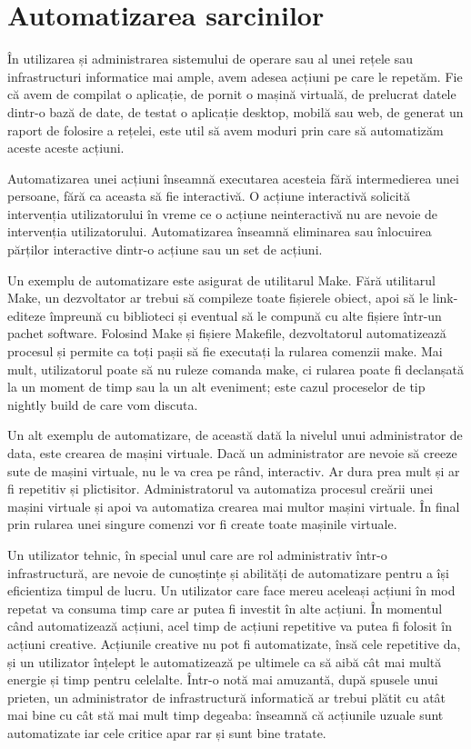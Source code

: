 \chapter{Automatizarea sarcinilor}
\label{chapter:script}

În utilizarea și administrarea sistemului de operare sau al unei rețele sau
infrastructuri informatice mai ample, avem adesea acțiuni pe care le repetăm.
Fie că avem de compilat o aplicație, de pornit o mașină virtuală, de prelucrat
datele dintr-o bază de date, de testat o aplicație desktop, mobilă sau web, de
generat un raport de folosire a rețelei, este util să avem moduri prin care să
automatizăm aceste aceste acțiuni.

Automatizarea unei acțiuni înseamnă executarea acesteia fără intermedierea unei
persoane, fără ca aceasta să fie interactivă. O acțiune interactivă solicită
intervenția utilizatorului în vreme ce o acțiune neinteractivă nu are nevoie de
intervenția utilizatorului. Automatizarea înseamnă eliminarea sau înlocuirea
părților interactive dintr-o acțiune sau un set de acțiuni.

Un exemplu de automatizare este asigurat de utilitarul Make. Fără utilitarul
Make, un dezvoltator ar trebui să compileze toate fișierele obiect, apoi să le
link-editeze împreună cu biblioteci și eventual să le compună cu alte fișiere
într-un pachet software. Folosind Make și fișiere Makefile, dezvoltatorul
automatizează procesul și permite ca toți pașii să fie executați la rularea
comenzii make. Mai mult, utilizatorul poate să nu ruleze comanda make, ci
rularea poate fi declanșată la un moment de timp sau la un alt eveniment; este
cazul proceselor de tip nightly build de care vom discuta.

Un alt exemplu de automatizare, de această dată la nivelul unui administrator de
data, este crearea de mașini virtuale. Dacă un administrator are nevoie să
creeze sute de mașini virtuale, nu le va crea pe rând, interactiv. Ar dura prea
mult și ar fi repetitiv și plictisitor. Administratorul va automatiza procesul
creării unei mașini virtuale și apoi va automatiza crearea mai multor mașini
virtuale. În final prin rularea unei singure comenzi vor fi create toate
mașinile virtuale.

Un utilizator tehnic, în special unul care are rol administrativ într-o
infrastructură, are nevoie de cunoștințe și abilități de automatizare pentru a
își eficientiza timpul de lucru. Un utilizator care face mereu aceleași acțiuni
în mod repetat va consuma timp care ar putea fi investit în alte acțiuni. În
momentul când automatizează acțiuni, acel timp de acțiuni repetitive va putea fi
folosit în acțiuni creative. Acțiunile creative nu pot fi automatizate, însă
cele repetitive da, și un utilizator înțelept le automatizează pe ultimele ca să
aibă cât mai multă energie și timp pentru celelalte. Într-o notă mai amuzantă,
după spusele unui prieten, un administrator de infrastructură informatică ar
trebui plătit cu atât mai bine cu cât stă mai mult timp degeaba: înseamnă că
acțiunile uzuale sunt automatizate iar cele critice apar rar și sunt bine
tratate.

